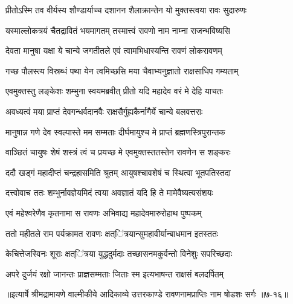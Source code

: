 \twolineshloka
{प्रीतोऽस्मि तव वीर्यस्य शौण्डार्याच्च दशानन}
{शैलाक्रान्तेन यो मुक्तस्त्वया रावः सुदारुणः} %

\twolineshloka
{यस्माल्लोकत्रयं चैतद्रावितं भयमागतम्}
{तस्मात्त्वं रावणो नाम नाम्ना राजन्भविष्यसि} %

\twolineshloka
{देवता मानुषा यक्षा ये चान्ये जगतीतले}
{एवं त्वामभिधास्यन्ति रावणं लोकरावणम्} %

\twolineshloka
{गच्छ पौलस्त्य विस्रब्धं पथा येन त्वमिच्छसि}
{मया चैवाभ्यनुज्ञातो राक्षसाधिप गम्यताम्} %

\twolineshloka
{एवमुक्तस्तु लङ्केशः शम्भुना स्वयमब्रवीत्}
{प्रीतो यदि महादेव वरं मे देहि याचतः} %

\twolineshloka
{अवध्यत्वं मया प्राप्तं देवगन्धर्वदानवैः}
{राक्षसैर्गुह्यकैर्नागैर्ये चान्ये बलवत्तराः} %

\twolineshloka
{मानुषान्न गणे देव स्वल्पास्ते मम सम्मताः}
{दीर्घमायुश्च मे प्राप्तं ब्रह्मणस्त्रिपुरान्तक} %

\twolineshloka
{वाञ्छितं चायुषः शेषं शस्त्रं त्वं च प्रयच्छ मे}
{एवमुक्तस्ततस्तेन रावणेन स शङ्करः} %

\twolineshloka
{ददौ खड्गं महादीप्तं चन्द्रहासमिति श्रुतम्}
{आयुषश्चावशेषं च स्थित्वा भूतपतिस्तदा} %

\twolineshloka
{दत्त्वोवाच ततः शम्भुर्नावज्ञेयमिदं त्वया}
{अवज्ञातं यदि हि ते मामेवैष्यत्यसंशयः} %

\twolineshloka
{एवं महेश्वरेणैव कृतनामा स रावणः}
{अभिवाद्य महादेवमारुरोहाथ पुष्पकम्} %

\twolineshloka
{ततो महीतले राम पर्यक्रामत रावणः}
{क्षत्ऺित्रयान्सुमहावीर्यान्बाधमान इतस्ततः} %

\twolineshloka
{केचित्तेजस्विनः शूराः क्षत्ऺित्रया युद्धदुर्मदाः}
{तच्छासनमकुर्वन्तो विनेशुः सपरिच्छदाः} %

\twolineshloka
{अपरे दुर्जयं रक्षो जानन्तः प्राज्ञसम्मताः}
{जिताः स्म इत्यभाषन्त राक्षसं बलदर्पितम्} %


॥इत्यार्षे श्रीमद्रामायणे वाल्मीकीये आदिकाव्ये उत्तरकाण्डे रावणनामप्राप्तिः नाम षोडशः सर्गः ॥७-१६॥
